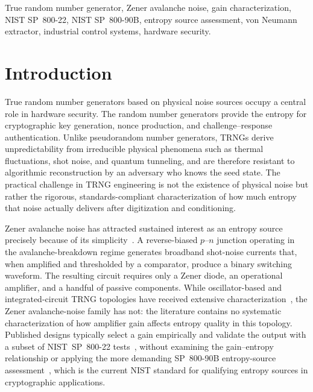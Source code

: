 \documentclass[conference]{IEEEtran}
\begin{document}
\begin{IEEEkeywords}
True random number generator, Zener avalanche noise, gain
characterization, NIST SP~800-22, NIST SP~800-90B, entropy source
assessment, von Neumann extractor, industrial control systems,
hardware security.
\end{IEEEkeywords}

\section{Introduction}\label{sec:intro}

True random number generators based on physical noise sources occupy a
central role in hardware security. The random number generators provide the entropy for
cryptographic key generation, nonce production, and challenge--response
authentication. Unlike pseudorandom number
generators, TRNGs derive unpredictability from irreducible physical
phenomena such as thermal fluctuations, shot noise, and quantum
tunneling, and are therefore resistant to algorithmic reconstruction by an adversary who knows the seed state. The practical challenge in TRNG engineering
is not the existence of physical noise but rather the rigorous,
standards-compliant characterization of how much entropy that noise
actually delivers after digitization and conditioning.

Zener avalanche noise has attracted sustained interest as an entropy
source precisely because of its simplicity~\cite{taylor2011, tkacik2002}.
A reverse-biased $p$--$n$ junction operating in the avalanche-breakdown
regime generates broadband shot-noise currents that, when amplified and
thresholded by a comparator, produce a binary switching waveform. The
resulting circuit requires only a Zener diode, an operational amplifier,
and a handful of passive components. 
While oscillator-based and integrated-circuit TRNG topologies have
received extensive characterization~\cite{sunar2007, bucci2003,
baudet2011}, the Zener avalanche-noise family has not: the literature
contains no systematic characterization of how amplifier gain affects
entropy quality in this topology. Published designs typically select a gain empirically and
validate the output with a subset of NIST~SP~800-22 tests~\cite{nist80022},
without examining the gain--entropy relationship or applying the more
demanding SP~800-90B entropy-source assessment~\cite{nist80090b}, which
is the current NIST standard for qualifying entropy sources in
cryptographic applications.
\end{document}
